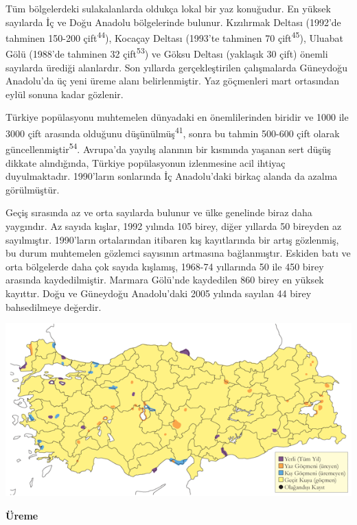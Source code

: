 \documentclass[
  letterpaper,
  DIV=11,
  numbers=noendperiod]{scrreprt}
\begin{document}
Tüm bölgelerdeki sulakalanlarda oldukça lokal bir yaz konuğudur. En
yüksek sayılarda İç ve Doğu Anadolu bölgelerinde bulunur. Kızılırmak
Deltası (1992'de tahminen 150-200 çift\textsuperscript{44}), Kocaçay
Deltası (1993'te tahminen 70 çift\textsuperscript{45}), Uluabat Gölü
(1988'de tahminen 32 çift\textsuperscript{53}) ve Göksu Deltası
(yaklaşık 30 çift) önemli sayılarda ürediği alanlardır. Son yıllarda
gerçekleştirilen çalışmalarda Güneydoğu Anadolu'da üç yeni üreme alanı
belirlenmiştir. Yaz göçmenleri mart ortasından eylül sonuna kadar
gözlenir.

Türkiye popülasyonu muhtemelen dünyadaki en önemlilerinden biridir ve
1000 ile 3000 çift arasında olduğunu düşünülmüş\textsuperscript{41},
sonra bu tahmin 500-600 çift olarak güncellenmiştir\textsuperscript{54}.
Avrupa'da yayılış alanının bir kısmında yaşanan sert düşüş dikkate
alındığında, Türkiye popülasyonun izlenmesine acil ihtiyaç
duyulmaktadır. 1990'ların sonlarında İç Anadolu'daki birkaç alanda da
azalma görülmüştür.

Geçiş sırasında az ve orta sayılarda bulunur ve ülke genelinde biraz
daha yaygındır. Az sayıda kışlar, 1992 yılında 105 birey, diğer yıllarda
50 bireyden az sayılmıştır. 1990'ların ortalarından itibaren kış
kayıtlarında bir artış gözlenmiş, bu durum muhtemelen gözlemci sayısının
artmasına bağlanmıştır. Eskiden batı ve orta bölgelerde daha çok sayıda
kışlamış, 1968-74 yıllarında 50 ile 450 birey arasında kaydedilmiştir.
Marmara Gölü'nde kaydedilen 860 birey en yüksek kayıttır. Doğu ve
Güneydoğu Anadolu'daki 2005 yılında sayılan 44 birey bahsedilmeye
değerdir.

\includegraphics{images/harita_Page_024.png}

\textbf{Üreme}
\end{document}
